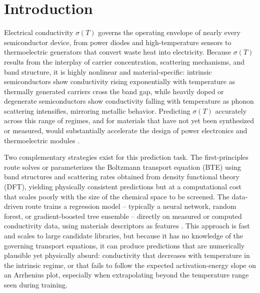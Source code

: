 \documentclass[11pt]{article}
\begin{document}
\begin{otherlanguage}{arabic}
\begin{abstract}
\vspace{0.5em}
\noindent\textbf{الكلمات المفتاحية:} التعلّم الآلي الموجَّه فيزيائيًا، توصيلية أشباه الموصلات، الواصفات الإلكترونية البنيوية، معادلة بولتزمان للنقل، معلوماتية المواد، خصائص النقل المعتمدة على درجة الحرارة
\end{abstract}
\end{otherlanguage}

\section{Introduction}

Electrical conductivity $\sigma(T)$ governs the operating envelope of nearly every semiconductor device, from power diodes and high-temperature sensors to thermoelectric generators that convert waste heat into electricity. Because $\sigma(T)$ results from the interplay of carrier concentration, scattering mechanisms, and band structure, it is highly nonlinear and material-specific: intrinsic semiconductors show conductivity rising exponentially with temperature as thermally generated carriers cross the band gap, while heavily doped or degenerate semiconductors show conductivity falling with temperature as phonon scattering intensifies, mirroring metallic behavior. Predicting $\sigma(T)$ accurately across this range of regimes, and for materials that have not yet been synthesized or measured, would substantially accelerate the design of power electronics and thermoelectric modules \citep{gorai2017computationally,snyder2008complex}.

Two complementary strategies exist for this prediction task. The first-principles route solves or parameterizes the Boltzmann transport equation (BTE) using band structures and scattering rates obtained from density functional theory (DFT), yielding physically consistent predictions but at a computational cost that scales poorly with the size of the chemical space to be screened. The data-driven route trains a regression model -- typically a neural network, random forest, or gradient-boosted tree ensemble -- directly on measured or computed conductivity data, using materials descriptors as features \citep{ward2016general,butler2018machine,ramprasad2017machine}. This approach is fast and scales to large candidate libraries, but because it has no knowledge of the governing transport equations, it can produce predictions that are numerically plausible yet physically absurd: conductivity that decreases with temperature in the intrinsic regime, or that fails to follow the expected activation-energy slope on an Arrhenius plot, especially when extrapolating beyond the temperature range seen during training.
\end{document}
